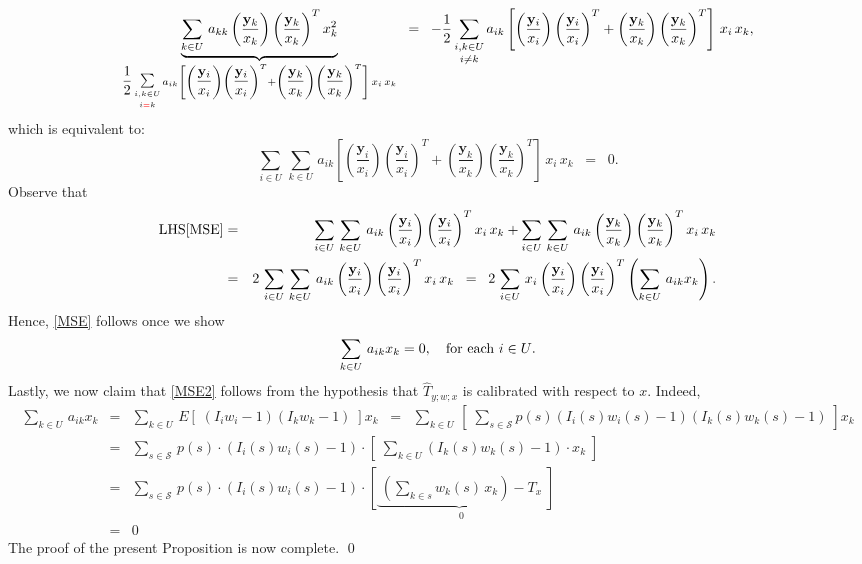 \documentclass{article}
\begin{document}
\begin{equation*}
\underset{
\dfrac{1}{2}\,\underset{i {\color{red}=} k}{\underset{i,k\in U}{\textnormal{\large$\sum$}}}\,a_{ik}\left[
   \left(\dfrac{\mathbf{y}_{i}}{x_{i}}\right)\left(\dfrac{\mathbf{y}_{i}}{x_{i}}\right)^{T}
+ \left(\dfrac{\mathbf{y}_{k}}{x_{k}}\right)\left(\dfrac{\mathbf{y}_{k}}{x_{k}}\right)^{T}
\right]\,x_{i}\,x_{k}
}{
\underbrace{\sum_{k \in U}\,a_{kk}\left(\dfrac{\mathbf{y}_{k}}{x_{k}}\right)\left(\dfrac{\mathbf{y}_{k}}{x_{k}}\right)^{T}x_{k}^{2}}
}
\;\;=\;\;
- \dfrac{1}{2}\,\underset{i \neq k}{\sum_{i,k\in U}}\,a_{ik}\left[
   \left(\dfrac{\mathbf{y}_{i}}{x_{i}}\right)\left(\dfrac{\mathbf{y}_{i}}{x_{i}}\right)^{T}
+ \left(\dfrac{\mathbf{y}_{k}}{x_{k}}\right)\left(\dfrac{\mathbf{y}_{k}}{x_{k}}\right)^{T}
\right]\,x_{i}\,x_{k},
\end{equation*}
which is equivalent to:
\begin{equation}\label{MSE}
\sum_{i\in U}\,\sum_{k\in U}\,a_{ik}\left[
   \left(\dfrac{\mathbf{y}_{i}}{x_{i}}\right)\left(\dfrac{\mathbf{y}_{i}}{x_{i}}\right)^{T}
+ \left(\dfrac{\mathbf{y}_{k}}{x_{k}}\right)\left(\dfrac{\mathbf{y}_{k}}{x_{k}}\right)^{T}
\right]\,x_{i}\,x_{k}
\;\;=\;\; 0.
\end{equation}
Observe that
\begin{eqnarray*}
\textnormal{LHS\eqref{MSE}}
&=&
\sum_{i\in U}\,\sum_{k\in U}\,a_{ik}\left(\dfrac{\mathbf{y}_{i}}{x_{i}}\right)\left(\dfrac{\mathbf{y}_{i}}{x_{i}}\right)^{T}x_{i}\,x_{k}
+
\sum_{i\in U}\,\sum_{k\in U}\,a_{ik}\left(\dfrac{\mathbf{y}_{k}}{x_{k}}\right)\left(\dfrac{\mathbf{y}_{k}}{x_{k}}\right)^{T}x_{i}\,x_{k} \\
&=&
2\,\sum_{i\in U}\,\sum_{k\in U}\,a_{ik}\left(\dfrac{\mathbf{y}_{i}}{x_{i}}\right)\left(\dfrac{\mathbf{y}_{i}}{x_{i}}\right)^{T}x_{i}\,x_{k}
\;\;=\;\; 2\,\sum_{i\in U}\,x_{i}\left(\dfrac{\mathbf{y}_{i}}{x_{i}}\right)\left(\dfrac{\mathbf{y}_{i}}{x_{i}}\right)^{T}\left(\sum_{k\in U}\,a_{ik}x_{k}\right).
\end{eqnarray*}
Hence, \eqref{MSE} follows once we show
\begin{equation}\label{MSE2}
\sum_{k\in U}\,a_{ik}x_{k} = 0,
\quad\textnormal{for each $i \in U$.}
\end{equation}
Lastly, we now claim that \eqref{MSE2} follows from the hypothesis that
$\widehat{T}_{y;w;x}$ is calibrated with respect to $x$.
Indeed,
\begin{eqnarray*}
\sum_{k \in U}\,a_{ik}x_{k}
&=& \sum_{k\in U}\,E\!\left[\;(I_{i}w_{i}-1)(I_{k}w_{k}-1)\;\right] x_{k}
\;\;=\;\; \sum_{k\in U}\,\left[\;\sum_{s\in\mathcal{S}}p(s)(I_{i}(s)w_{i}(s)-1)(I_{k}(s)w_{k}(s)-1)\;\right] x_{k} \\
&=& \sum_{s\in\mathcal{S}}\,p(s)\cdot\left(I_{i}(s)w_{i}(s)-1\right)\cdot\left[\;\sum_{k\in U}\left(I_{k}(s)w_{k}(s)-1\right)\cdot x_{k}\;\right] \\
&=& \sum_{s\in\mathcal{S}}\,p(s)\cdot\left(I_{i}(s)w_{i}(s)-1\right)\cdot\underset{0}{\left[\underbrace{\;\left(\sum_{k\in s}w_{k}(s)\,x_{k}\right) - T_{x}}\;\right]}\\
&=& 0
\end{eqnarray*}
The proof of the present Proposition is now complete. \qed
\end{document}
